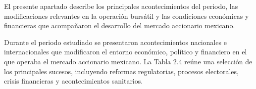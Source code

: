 El presente apartado describe los principales acontecimientos del periodo, las modificaciones relevantes en la operación bursátil y las condiciones económicas y financieras que acompañaron el desarrollo del mercado accionario mexicano.


Durante el periodo estudiado se presentaron acontecimientos nacionales e internacionales que modificaron el entorno económico, político y financiero en el que operaba el mercado accionario mexicano. La Tabla 2.4 reúne una selección de los principales sucesos, incluyendo reformas regulatorias, procesos electorales, crisis financieras y acontecimientos sanitarios.


